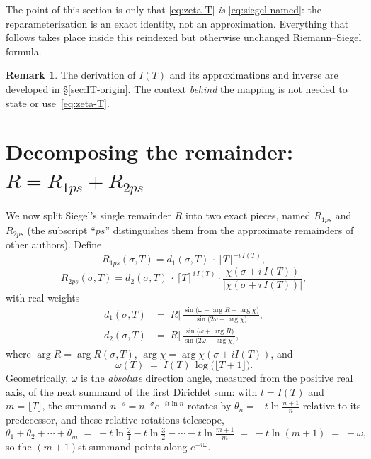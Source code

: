 \documentclass[11pt]{article}
\theoremstyle{definition}
\newtheorem{remark}[theorem]{Remark}
\begin{document}
The point of this section is only that \eqref{eq:zeta-T} \emph{is}
\eqref{eq:siegel-named}: the reparameterization is an exact identity, not an
approximation. Everything that follows takes place inside this reindexed but
otherwise unchanged Riemann--Siegel formula.

\begin{remark}
The derivation of $I(T)$ and its approximations and inverse are developed in
\S\ref{sec:IT-origin}. The context \emph{behind} the mapping is not needed to
state or use~\eqref{eq:zeta-T}.
\end{remark}

\section{Decomposing the remainder: \texorpdfstring{$R=R_{1ps}+R_{2ps}$}{R = R1ps + R2ps}}\label{sec:decomp}

We now split Siegel's single remainder $R$ into two exact pieces, named
$R_{1ps}$ and $R_{2ps}$ (the subscript ``$ps$'' distinguishes them from the
approximate remainders of other authors). Define
\begin{equation}\label{eq:R1ps-def}
R_{1ps}(\sigma, T) = d_{1}(\sigma, T)\,\cdot\, \lceil T \rceil^{-i\,I(T)},
\end{equation}
\begin{equation}\label{eq:R2ps-def}
R_{2ps}(\sigma, T) = d_{2}(\sigma, T)\,\cdot\, \lceil T \rceil^{\,i\,I(T)}
\cdot \frac{\chi(\sigma + i\,I(T))}{|\chi(\sigma + i\,I(T))|},
\end{equation}
with real weights
\begin{align}
d_{1}(\sigma,T) &= |R|\,
\frac{\sin\!\bigl(\omega - \arg R + \arg\chi\bigr)}{\sin\!\bigl(2\omega + \arg\chi\bigr)},
\label{eq:d1}\\[4pt]
d_{2}(\sigma,T) &= |R|\,
\frac{\sin\!\bigl(\omega + \arg R\bigr)}{\sin\!\bigl(2\omega + \arg\chi\bigr)},
\label{eq:d2}
\end{align}
where $\arg R=\arg R(\sigma,T)$, $\arg\chi=\arg\chi(\sigma+iI(T))$, and
\begin{equation}
\omega(T) \;=\; I(T)\,\log\!\bigl(\lfloor T+1\rfloor\bigr).
\end{equation}
Geometrically, $\omega$ is the \emph{absolute} direction angle, measured from
the positive real axis, of the next summand of the first Dirichlet sum: with
$t=I(T)$ and $m=\lfloor T\rfloor$, the summand $n^{-s}=n^{-\sigma}e^{-it\ln n}$
rotates by $\theta_n=-t\ln\tfrac{n+1}{n}$ relative to its predecessor, and these
relative rotations telescope,
\begin{equation}\label{eq:omega-telescope}
\theta_1+\theta_2+\cdots+\theta_m
\;=\;
-t\ln\tfrac{2}{1}-t\ln\tfrac{3}{2}-\cdots-t\ln\tfrac{m+1}{m}
\;=\;
-t\ln(m+1)
\;=\;
-\omega,
\end{equation}
so the $(m+1)$st summand points along $e^{-i\omega}$.
\end{document}
